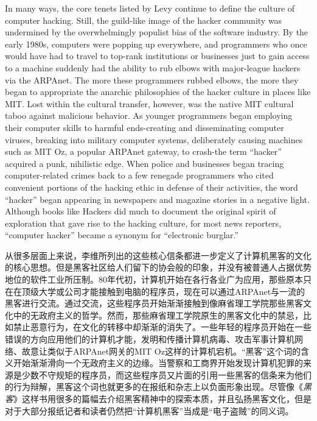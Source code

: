 \ifdefined\eng
In many ways, the core tenets listed by Levy continue to define the culture of computer hacking. Still, the guild-like image of the hacker community was undermined by the overwhelmingly populist bias of the software industry. By the early 1980s, computers were popping up everywhere, and programmers who once would have had to travel to top-rank institutions or businesses just to gain access to a machine suddenly had the ability to rub elbows with major-league hackers via the ARPAnet. The more these programmers rubbed elbows, the more they began to appropriate the anarchic philosophies of the hacker culture in places like MIT. Lost within the cultural transfer, however, was the native MIT cultural taboo against malicious behavior. As younger programmers began employing their computer skills to harmful ends-creating and disseminating computer viruses, breaking into military computer systems, deliberately causing machines such as MIT Oz, a popular ARPAnet gateway, to crash-the term ``hacker'' acquired a punk, nihilistic edge. When police and businesses began tracing computer-related crimes back to a few renegade programmers who cited convenient portions of the hacking ethic in defense of their activities, the word ``hacker'' began appearing in newspapers and magazine stories in a negative light. Although books like Hackers did much to document the original spirit of exploration that gave rise to the hacking culture, for most news reporters, ``computer hacker'' became a synonym for ``electronic burglar.''
\fi

\ifdefined\chs
从很多层面上来说，李维所列出的这些核心信条都进一步定义了计算机黑客的文化的核心思想。但是黑客社区给人们留下的协会般的印象，并没有被普通人占据优势地位的软件工业所压制。80年代初，计算机开始在各行各业广为应用，那些原本只在在顶级大学或公司才能接触到电脑的程序员，现在可以通过ARPAnet与一流的黑客进行交流。通过交流，这些程序员开始渐渐接触到像麻省理工学院那些黑客文化中的无政府主义的哲学。然而，那些麻省理工学院原生的黑客文化中的禁忌，比如禁止恶意行为，在文化的转移中却渐渐的消失了。一些年轻的程序员开始在一些错误的方向应用他们的计算机才能，发明和传播计算机病毒、攻击军事计算机网络、故意让类似于ARPAnet网关的MIT Oz这样的计算机宕机。“黑客”这个词的含义开始渐渐滑向一个无政府主义的边缘。当警察和工商界开始发现计算机犯罪的来源是少数不守规矩的程序员，而这些程序员又片面的引用一些黑客的信条来为他们的行为辩解，黑客这个词也就更多的在报纸和杂志上以负面形象出现。尽管像《\textit{黑客}》这样书用很多的篇幅去介绍黑客精神中的探索本质，并且弘扬黑客文化，但是对于大部分报纸记者和读者仍然把“计算机黑客”当成是“电子盗贼”的同义词。
\fi

